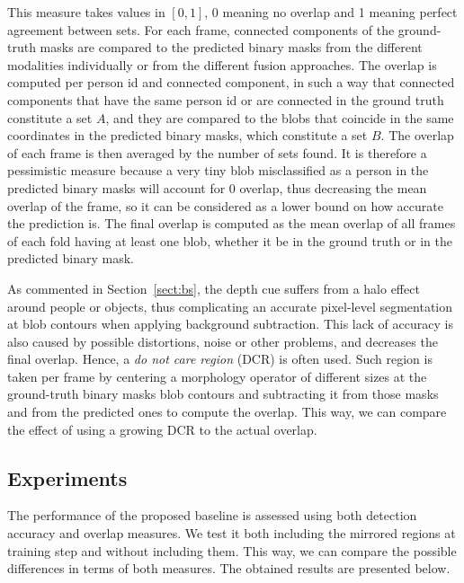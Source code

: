 \documentclass[10pt,twocolumn,letterpaper]{article}
\begin{document}
This measure takes values in $[0,1]$, 0 meaning no overlap and 1 meaning perfect agreement between sets. For each frame, connected components of the ground-truth masks are compared to the predicted binary masks from the different modalities individually or from the different fusion approaches. The overlap is computed per person id and connected component, in such a way that connected components that have the same person id or are connected in the ground truth constitute a set $A$, and they are compared to the blobs that coincide in the same coordinates in the predicted binary masks, which constitute a set $B$. The overlap of each frame is then averaged by the number of sets found. It is therefore a pessimistic measure because a very tiny blob misclassified as a person in the predicted binary masks will account for 0 overlap, thus decreasing the mean overlap of the frame, so it can be considered as a lower bound on how accurate the prediction is. The final overlap is computed as the mean overlap of all frames of each fold having at least one blob, whether it be in the ground truth or in the predicted binary mask.

As commented in Section~\ref{sect:bs}, the depth cue suffers from a halo effect around people or objects, thus complicating an accurate pixel-level segmentation at blob contours when applying background subtraction. This lack of accuracy is also caused by possible distortions, noise or other problems, and decreases the final overlap. Hence, a \emph{do not care region} (DCR) is often used. Such region is taken per frame by centering a morphology operator of different sizes at the ground-truth binary masks blob contours and subtracting it from those masks and from the predicted ones to compute the overlap. This way, we can compare the effect of using a growing DCR to the actual overlap.


\subsection{Experiments}

The performance of the proposed baseline is assessed using both detection accuracy and overlap measures. We test it both including the mirrored regions at training step and without including them. This way, we can compare the possible differences in terms of both measures.
The obtained results are presented below.
\end{document}
